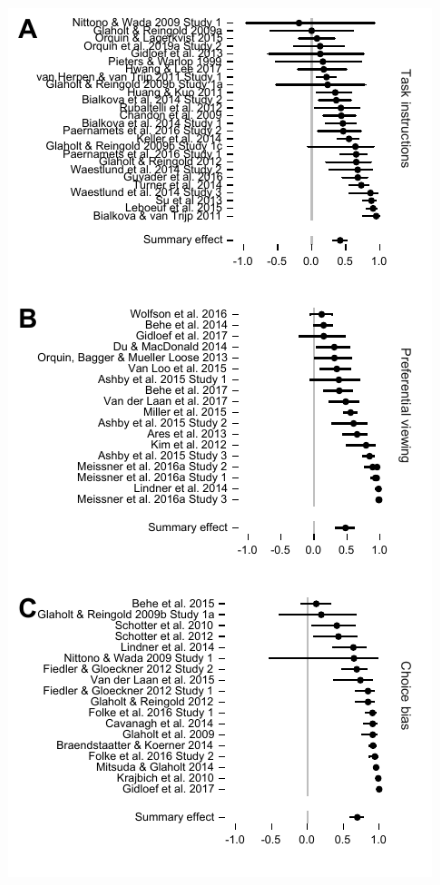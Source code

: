 \documentclass[english,natbib,man,floatsintext]{apa6}
\begin{document}


\begin{figure}%
\includegraphics{forest_plots_cognitive}

\end{figure}
\end{document}
